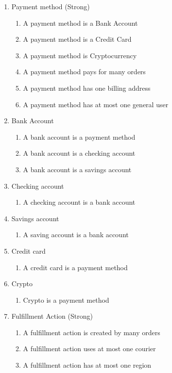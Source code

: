 \begin{enumerate}
\item Payment method (Strong)
\begin{enumerate}
	\item A payment method is a Bank Account
	\item A payment method is a Credit Card
	\item A payment method is Cryptocurrency
	\item A payment method pays for many orders
	\item A payment method has one billing address
	\item A payment method has at most one general user
\end{enumerate}
	
\item Bank Account
\begin{enumerate}
	\item A bank account is a payment method
	\item A bank account is a checking account
	\item A bank account is a savings account
\end{enumerate}
	
\item Checking account
\begin{enumerate}
	\item A checking account is a bank account
\end{enumerate}
	
\item Savings account
\begin{enumerate}
	\item A saving account is a bank account
\end{enumerate}
	
\item Credit card
\begin{enumerate}
	\item A credit card is a payment method
\end{enumerate}
	
\item Crypto
\begin{enumerate}
	\item Crypto is a payment method
\end{enumerate}
	
\item Fulfillment Action (Strong)
\begin{enumerate}
	\item A fulfillment action is created by many orders
	\item A fulfillment action uses at most one courier
	\item A fulfillment action has at most one region
\end{enumerate}
	

\end{enumerate}
